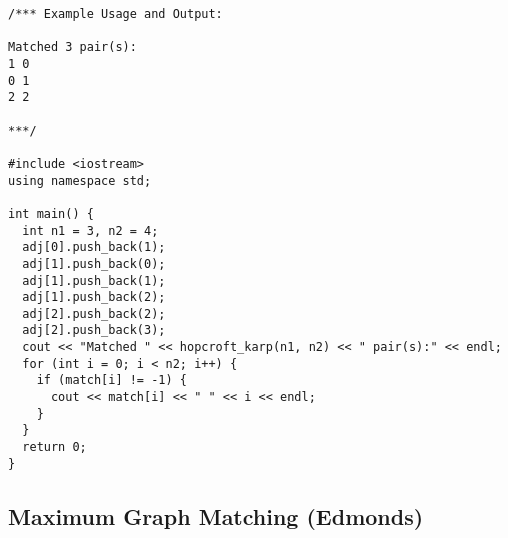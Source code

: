 \begin{lstlisting}
/*** Example Usage and Output:

Matched 3 pair(s):
1 0
0 1
2 2

***/

#include <iostream>
using namespace std;

int main() {
  int n1 = 3, n2 = 4;
  adj[0].push_back(1);
  adj[1].push_back(0);
  adj[1].push_back(1);
  adj[1].push_back(2);
  adj[2].push_back(2);
  adj[2].push_back(3);
  cout << "Matched " << hopcroft_karp(n1, n2) << " pair(s):" << endl;
  for (int i = 0; i < n2; i++) {
    if (match[i] != -1) {
      cout << match[i] << " " << i << endl;
    }
  }
  return 0;
}
\end{lstlisting}
\subsection{Maximum Graph Matching (Edmonds)}
